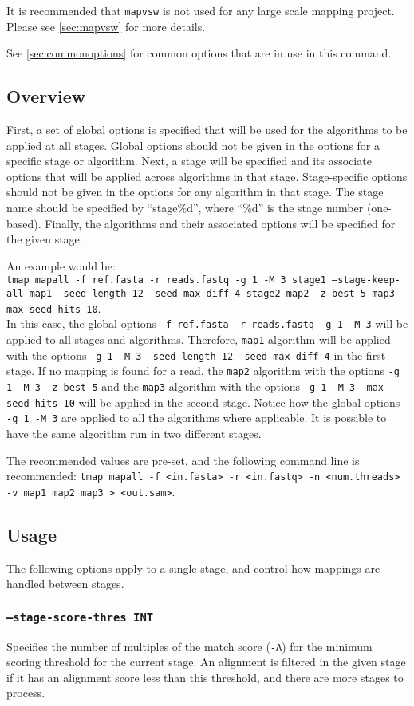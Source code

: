 \documentclass[a4paper,12pt]{book}
\newcommand{\TT}[1]{{\tt #1}} %
\begin{document}
It is recommended that \TT{mapvsw} is not used for any large scale mapping project.  
Please see \autoref{sec:mapvsw} for more details.

See \autoref{sec:commonoptions} for common options that are in use in this command.

\subsection{Overview}
First, a set of global options is specified that will be used for the algorithms to be applied at all stages.
Global options should not be given in the options for a specific stage or algorithm.
Next, a stage will be specified and its associate options that will be applied across algorithms in that stage.
Stage-specific options should not be given in the options for any algorithm in that stage.
The stage name should be specified by ``stage\%d'', where ``\%d'' is the stage number (one-based).
Finally, the algorithms and their associated options will be specified for the given stage.

An example would be:\\
\TT{tmap mapall -f ref.fasta -r reads.fastq -g 1 -M 3 stage1 --stage-keep-all map1 --seed-length 12 --seed-max-diff 4 stage2 map2 --z-best 5 map3 --max-seed-hits 10}.\\
In this case, the global options \TT{-f ref.fasta -r reads.fastq -g 1 -M 3} will be applied to all stages and algorithms. 
Therefore, \TT{map1} algorithm will be applied with the options \TT{-g 1 -M 3 --seed-length 12 --seed-max-diff 4} in the first stage.
If no mapping is found for a read, the \TT{map2} algorithm with the options \TT{-g 1 -M 3 --z-best 5} and the \TT{map3} algorithm with the options \TT{-g 1 -M 3 --max-seed-hits 10} will be applied in the second stage.
Notice how the global options \TT{-g 1 -M 3} are applied to all the algorithms where applicable.
It is possible to have the same algorithm run in two different stages.

The recommended values are pre-set, and the following command line is recommended:
\TT{tmap mapall -f <in.fasta> -r <in.fastq> -n <num.threads> -v map1 map2 map3 > <out.sam>}.

\subsection{Usage}
The following options apply to a single stage, and control how mappings are handled between stages.
\subsubsection{\TT{--stage-score-thres INT}}
Specifies the number of multiples of the match score (\TT{-A}) for the minimum scoring threshold for the current  stage.
An alignment is filtered in the given stage if it has an alignment score less than this threshold, and there are more stages to process.
\end{document}
